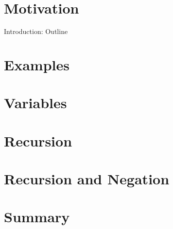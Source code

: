 \newcommand{\myinput}[1]{
\ifx\inlibrary\undefined
  
\else
  
\fi
}

\newcommand{\addextrainput}[0]{1}

\newcommand{\extrainput}[1]{
\ifx\addextrainput\undefined
  {}
\else
  \myinput{#1}
\fi
}

\myinput{ezasp/macros}
\myinput{ezasp/summary}
\section{Motivation}
\extrainput{ezasp/tampere/asp}
\myinput{ezasp/motivation}
\begin{frame}{Introduction: Outline}
  \medskip
  \tableofcontents
\end{frame}
\section{Examples}
\myinput{ezasp/example1}
\myinput{ezasp/example2}
\section{Variables}
\myinput{ezasp/example3}
\myinput{ezasp/example4}
\section{Recursion}
\myinput{ezasp/example5}
\myinput{ezasp/example6}
\myinput{ezasp/traveling}
\myinput{ezasp/oddeven}
\section{Recursion and Negation}
\myinput{ezasp/negative}
\section{Summary}
